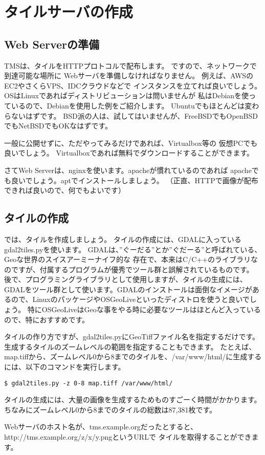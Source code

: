 \chapter*{タイルサーバの作成}

\section*{Web Serverの準備}
TMSは、タイルをHTTPプロトコルで配布します。
ですので、ネットワークで到達可能な場所に
Webサーバを準備しなければなりません。
例えば、AWSのEC2やさくらVPS、IDCクラウドなどで
インスタンスを立てれば良いでしょう。
%
OSはLinuxであればディストリビューションは問いませんが
私はDebianを使っているので、Debianを使用した例をご紹介します。
Ubuntuでもほとんどは変わらないはずです。
BSD派の人は、試してはいませんが、FreeBSDでもOpenBSDでもNetBSDでもOKなはずです。

一般に公開せずに、ただやってみるだけであれば、Virtualbox等の
仮想PCでも良いでしょう。
Virtualboxであれば無料でダウンロードすることができます。

さてWeb Serverは、nginxを使います。apacheが慣れているのであれば
apacheでも良いでしょう。aptでインストールしましょう。
（正直、HTTPで画像が配布できれば良いので、何でもよいです）

\section*{タイルの作成}
では、タイルを作成しましょう。
タイルの作成には、GDALに入っているgdal2tiles.pyを使います。
GDALは、''ぐーだる''とか''ぐだーる''と呼ばれている、Geoな世界のスイスアーミーナイフ的な
存在で、本来はC/C++のライブラリなのですが、付属するプログラムが優秀でツール群と誤解されているものです。
後で、プログラミングライブラリとして使用しますが、タイルの生成には、GDALをツール群として使います。GDALのインストールは面倒なイメージがあるので、LinuxのパッケージやOSGeoLiveといったディストロを使うと良いでしょう。
特にOSGeoLiveはGeoな事をやる時に必要なツールはほとんど入っているので、特におすすめです。

タイルの作り方ですが、gdal2tiles.pyにGeoTiffファイル名を指定するだけです。
生成するタイルのズームレベルの範囲を指定することもできます。
たとえば、map.tiffから、ズームレベル0から8までのタイルを、/var/www/html/に生成するには、以下のコマンドを実行します。

\texttt{\$ gdal2tiles.py -z 0-8 map.tiff /var/www/html/}

タイルの生成には、大量の画像を生成するためものすごーく時間がかかります。
ちなみにズームレベル0から8までのタイルの総数は87,381枚です。

Webサーバのホスト名が、tms.example.orgだったとすると、
http://tms.example.org/{z}/{x}/{y}.pngというURLで
タイルを取得することができます。
